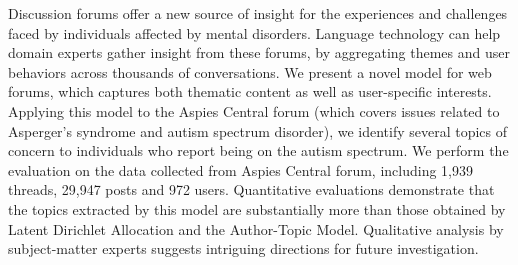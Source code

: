 Discussion forums offer a new source of insight for the experiences and challenges faced by individuals affected by mental disorders. Language technology can help domain experts gather insight from these forums, by aggregating themes and user behaviors across thousands of conversations. We present a novel model for web forums, which captures both thematic content as well as user-specific interests. Applying this model to the Aspies Central forum (which covers issues related to Asperger's syndrome and autism spectrum disorder), we identify several topics of concern to individuals who report being on the autism spectrum. We perform the evaluation on the data collected from Aspies Central forum, including 1,939 threads, 29,947 posts and 972 users. Quantitative evaluations demonstrate that the topics extracted by this model are substantially more than those obtained by Latent Dirichlet Allocation and the Author-Topic Model. Qualitative analysis by subject-matter experts suggests intriguing directions for future investigation.
